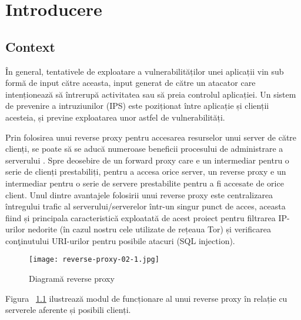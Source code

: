 

\chapter{Introducere}
\label{cap:Introducere}


\section{Context}

În general, tentativele de exploatare a vulnerabilităților unei aplicații vin sub formă de input către aceasta, input generat de către un atacator care intenționează să întrerupă activitatea sau să preia controlul aplicației. Un sistem de prevenire a intruziunilor (IPS) este poziționat între aplicație și clienții acesteia, și previne exploatarea unor astfel de vulnerabilități. 

Prin folosirea unui reverse proxy pentru accesarea resurselor unui server de către clienți, se poate să se aducă numeroase beneficii procesului de administrare a serverului \cite{top_8}. Spre deosebire de un forward proxy care e un intermediar pentru o serie de clienți prestabiliți, pentru a accesa orice server, un reverse proxy e un intermediar pentru o serie de servere prestabilite pentru a fi accesate de orice client. Unul dintre avantajele folosirii unui reverse proxy este centralizarea întregului trafic al serverului/serverelor într-un singur punct de acces, aceasta fiind și principala caracteristică exploatată de acest proiect pentru filtrarea IP-urilor nedorite (în cazul nostru cele utilizate de rețeaua Tor) și verificarea conţinutului URI-urilor pentru posibile atacuri (SQL injection).

\begin{figure}[h]
	\centering
	\texttt{[image: reverse-proxy-02-1.jpg]}
	\caption{ Diagramă reverse proxy }
	\label{fig:reverse-proxy}
\end{figure}

Figura ~\ref{fig:reverse-proxy}  ilustrează modul de funcționare al unui reverse proxy în relație cu serverele aferente și posibili clienți.  \\

 


